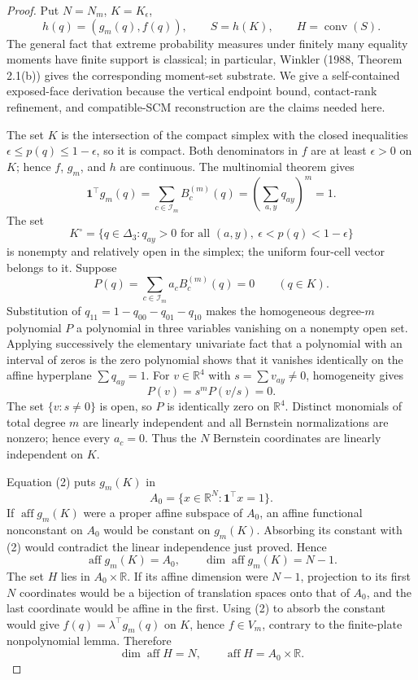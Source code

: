 \documentclass{article}
\begin{document}
\begin{proof}
Put \(N=N_m\), \(K=K_{\epsilon}\),
\[
 h(q)=(g_m(q),f(q)),\qquad S=h(K),\qquad H=\operatorname{conv}(S).
\tag{1}
\]
The general fact that extreme probability measures under finitely many equality moments have finite support is classical; in particular, Winkler (1988, Theorem 2.1(b)) gives the corresponding moment-set substrate.  We give a self-contained exposed-face derivation because the vertical endpoint bound, contact-rank refinement, and compatible-SCM reconstruction are the claims needed here.

The set \(K\) is the intersection of the compact simplex with the closed inequalities \(\epsilon\leq p(q)\leq1-\epsilon\), so it is compact.  Both denominators in \(f\) are at least \(\epsilon>0\) on \(K\); hence \(f\), \(g_m\), and \(h\) are continuous.  The multinomial theorem gives
\[
 \mathbf 1^{\top}g_m(q)=\sum_{c\in\mathcal I_m}B_c^{(m)}(q)
 =\left(\sum_{a,y}q_{ay}\right)^m=1.
\tag{2}
\]
The set
\[
 K^{\circ}=\{q\in\Delta_3:q_{ay}>0\text{ for all }(a,y),\ \epsilon<p(q)<1-\epsilon\}
\tag{3}
\]
is nonempty and relatively open in the simplex; the uniform four-cell vector belongs to it.  Suppose
\[
 P(q)=\sum_{c\in\mathcal I_m}a_cB_c^{(m)}(q)=0\qquad(q\in K).
\tag{4}
\]
Substitution of \(q_{11}=1-q_{00}-q_{01}-q_{10}\) makes the homogeneous degree-\(m\) polynomial \(P\) a polynomial in three variables vanishing on a nonempty open set.  Applying successively the elementary univariate fact that a polynomial with an interval of zeros is the zero polynomial shows that it vanishes identically on the affine hyperplane \(\sum q_{ay}=1\).  For \(v\in\mathbb R^4\) with \(s=\sum v_{ay}\neq0\), homogeneity gives
\[
 P(v)=s^mP(v/s)=0.
\tag{5}
\]
The set \(\{v:s\neq0\}\) is open, so \(P\) is identically zero on \(\mathbb R^4\).  Distinct monomials of total degree \(m\) are linearly independent and all Bernstein normalizations are nonzero; hence every \(a_c=0\).  Thus the \(N\) Bernstein coordinates are linearly independent on \(K\).

Equation (2) puts \(g_m(K)\) in
\[
 A_0=\{x\in\mathbb R^N:\mathbf1^{\top}x=1\}.
\tag{6}
\]
If \(\operatorname{aff}g_m(K)\) were a proper affine subspace of \(A_0\), an affine functional nonconstant on \(A_0\) would be constant on \(g_m(K)\).  Absorbing its constant with (2) would contradict the linear independence just proved.  Hence
\[
 \operatorname{aff}g_m(K)=A_0,
 \qquad \dim\operatorname{aff}g_m(K)=N-1.
\tag{7}
\]
The set \(H\) lies in \(A_0\times\mathbb R\).  If its affine dimension were \(N-1\), projection to its first \(N\) coordinates would be a bijection of translation spaces onto that of \(A_0\), and the last coordinate would be affine in the first.  Using (2) to absorb the constant would give \(f(q)=\lambda^{\top}g_m(q)\) on \(K\), hence \(f\in V_m\), contrary to the finite-plate nonpolynomial lemma.  Therefore
\[
 \dim\operatorname{aff}H=N,
 \qquad \operatorname{aff}H=A_0\times\mathbb R.
\tag{8}
\]


\end{proof}
\end{document}
